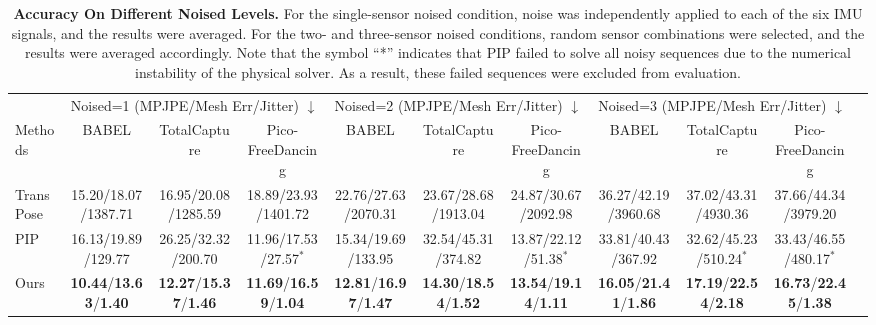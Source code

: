 \begin{table*}[t!]
    \centering
    \tabcolsep=0.15cm
    \tiny
    \begin{tabular}{lcccccccccc}
        \toprule
        & \multicolumn{3}{c}{Noised=1 (MPJPE/Mesh Err/Jitter) $\downarrow$} & \multicolumn{3}{c}{Noised=2 (MPJPE/Mesh Err/Jitter) $\downarrow$} & \multicolumn{3}{c}{Noised=3 (MPJPE/Mesh Err/Jitter) $\downarrow$}\\
        \cmidrule(lr){2-4}\cmidrule(lr){5-7}\cmidrule(lr){8-10}
        Methods & BABEL & TotalCapture & Pico-FreeDancing & BABEL & TotalCapture & Pico-FreeDancing & BABEL & TotalCapture & Pico-FreeDancing\\
        \midrule
        TransPose 
        & 15.20/18.07/1387.71 & 16.95/20.08/1285.59 & 18.89/23.93/1401.72 
        & 22.76/27.63/2070.31 & 23.67/28.68/1913.04 & 24.87/30.67/2092.98
        & 36.27/42.19/3960.68 & 37.02/43.31/4930.36 & 37.66/44.34/3979.20\\
        PIP 
        & 16.13/19.89/129.77 & 26.25/32.32/200.70 & 11.96/17.53/27.57$^*$
        & 15.34/19.69/133.95 & 32.54/45.31/374.82 & 13.87/22.12/51.38$^*$
        & 33.81/40.43/367.92 & 32.62/45.23/510.24$^*$ & 33.43/46.55/480.17$^*$\\
        Ours & 
        \textbf{10.44}/\textbf{13.63}/\textbf{1.40} & 
        \textbf{12.27}/\textbf{15.37}/\textbf{1.46} & 
        \textbf{11.69}/\textbf{16.59}/\textbf{1.04} &
        \textbf{12.81}/\textbf{16.97}/\textbf{1.47} &
        \textbf{14.30}/\textbf{18.54}/\textbf{1.52} &
        \textbf{13.54}/\textbf{19.14}/\textbf{1.11} &
        \textbf{16.05}/\textbf{21.41}/\textbf{1.86} &
        \textbf{17.19}/\textbf{22.54}/\textbf{2.18} &
        \textbf{16.73}/\textbf{22.45}/\textbf{1.38} &
        \\
        \bottomrule
    \end{tabular}
    \caption{\textbf{Accuracy On Different Noised Levels.} For the single-sensor noised condition, noise was independently applied to each of the six IMU signals, and the results were averaged. For the two- and three-sensor noised conditions, random sensor combinations were selected, and the results were averaged accordingly. 
    Note that the symbol ``*'' indicates that PIP failed to solve all noisy sequences due to the numerical instability of the physical solver. As a result, these failed sequences were excluded from evaluation.
    }
\label{tab:noised_mocap_comparison}
\end{table*}

